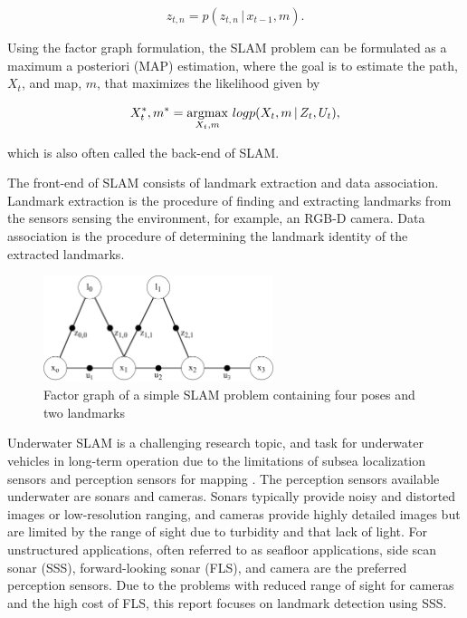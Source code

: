 \begin{equation}
    z_{t,n} = p(z_{t,n} \,|\, x_{t-1},m).
    \label{eq:landmark_measurement_pdf}
\end{equation}

Using the factor graph formulation, the SLAM problem can be formulated as a maximum a posteriori (MAP) estimation, where the goal is to estimate the path, $X_t$, and map, $m$, that maximizes the likelihood given by

\begin{equation}
    X_t^*, m^* = \operatorname*{argmax}_{X_t,m} \, logp(X_t,m \,|\, Z_t,U_t),
    \label{eq:SLAM}
\end{equation}

which is also often called the back-end of SLAM.

The front-end of SLAM consists of landmark extraction and data association. Landmark extraction is the procedure of finding and extracting landmarks from the sensors sensing the environment, for example, an RGB-D camera.  Data association is the procedure of determining the landmark identity of the extracted landmarks.

\begin{figure} [h]
    \centering
    \includegraphics[width=0.6\textwidth]{figures/factor_graph.drawio.pdf}
    \caption{Factor graph of a simple SLAM problem containing four poses and two landmarks}
    \label{fig:factor_graph}
\end{figure}


Underwater SLAM is a challenging research topic, and task for underwater vehicles in long-term operation due to the limitations of subsea localization sensors and perception sensors for mapping \cite{Hidalgo2015ReviewTechniques}. The perception sensors available underwater are sonars and cameras. Sonars typically provide noisy and distorted images or low-resolution ranging, and cameras provide highly detailed images but are limited by the range of sight due to turbidity and that lack of light. For unstructured applications, often referred to as seafloor applications, side scan sonar (SSS), forward-looking sonar (FLS), and camera are the preferred perception sensors. Due to the problems with reduced range of sight for cameras and the high cost of FLS, this report focuses on landmark detection using SSS.


